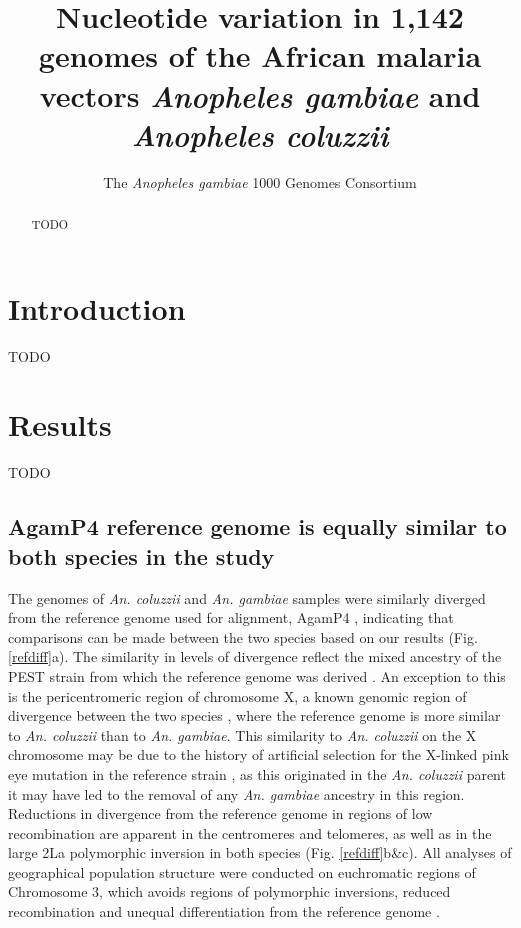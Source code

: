 \documentclass[a4paper,11pt,abstracton,hidelinks]{scrartcl}
\title{
Nucleotide variation in 1,142 genomes of the African malaria vectors \emph{Anopheles gambiae} and \emph{Anopheles coluzzii}
}
\author[1]{\small The \emph{Anopheles gambiae} 1000 Genomes Consortium}
\affil[1]{\footnotesize A list of consortium members appears at the end of the paper}
\begin{document}
\maketitle


\begin{abstract}

TODO

\end{abstract}


\section*{Introduction}

TODO


\section*{Results}

TODO

\subsection*{AgamP4 reference genome is equally similar to both species in the study}

The genomes of \textit{An. coluzzii} and \textit{An. gambiae} samples were similarly diverged from the reference genome used for alignment, AgamP4 \cite{Holt2002}, indicating that comparisons can be made between the two species based on our results (Fig. \ref{refdiff}a).
%
The similarity in levels of divergence reflect the mixed ancestry of the PEST strain from which the reference genome was derived \cite{Holt2002}.
%
An exception to this is the pericentromeric region of chromosome X, a known genomic region of divergence between the two species \cite{Ag1000gConsortium2017}, where the reference genome is more similar to \textit{An. coluzzii} than to \textit{An. gambiae}.
%
This similarity to \textit{An. coluzzii} on the X chromosome may be due to the history of artificial selection for the X-linked pink eye mutation in the reference strain \cite{Holt2002}, as this originated in the \textit{An. coluzzii} parent it may have led to the removal of any \textit{An. gambiae} ancestry in this region.
%
Reductions in divergence from the reference genome in regions of low recombination are apparent in the centromeres and telomeres, as well as in the large 2La polymorphic inversion in both species \cite{coluzzi2000} (Fig. \ref{refdiff}b\&c). 
%
All analyses of geographical population structure were conducted on euchromatic regions of Chromosome 3, which avoids regions of polymorphic inversions, reduced recombination and unequal differentiation from the reference genome \cite{Ag1000gConsortium2017}.
\end{document}
